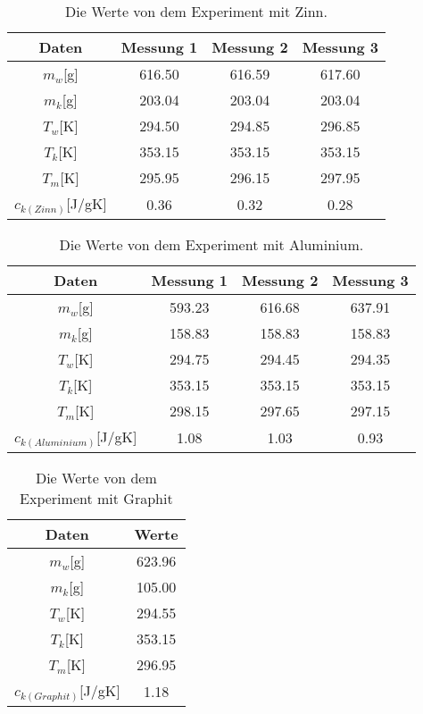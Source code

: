 \begin{table}[htp]
    \centering
    \caption{Die Werte von dem Experiment mit Zinn.}
    \label{tab:tabZn}
    \begin{tabular}{c c c c}
      \toprule
      Daten & Messung 1 & Messung 2 & Messung 3\\
      \midrule
            \(m_w\)[g] & 616.50 & 616.59 & 617.60\\
            \(m_k\)[g] & 203.04 & 203.04 & 203.04\\
            \(T_w\)[K] & 294.50 & 294.85 & 296.85\\
            \(T_k\)[K] & 353.15 & 353.15 & 353.15\\
            \(T_m\)[K] & 295.95 & 296.15 & 297.95\\
      \bottomrule
            \(c_{k(Zinn)}\)[J/gK] & 0.36 & 0.32 & 0.28\\
    \end{tabular}
  \end{table}

  \begin{table}[htp]
    \centering
    \caption{Die Werte von dem Experiment mit Aluminium.}
    \label{tab:tabAl}
    \begin{tabular}{c c c c}
      \toprule
      Daten & Messung 1 & Messung 2 & Messung 3\\
      \midrule
            \(m_w\)[g] & 593.23 & 616.68 & 637.91\\
            \(m_k\)[g] & 158.83 & 158.83 & 158.83\\
            \(T_w\)[K] & 294.75 & 294.45 & 294.35\\
            \(T_k\)[K] & 353.15 & 353.15 & 353.15\\
            \(T_m\)[K] & 298.15 & 297.65 & 297.15\\
      \bottomrule
            \(c_{k(Aluminium)}\)[J/gK] & 1.08 & 1.03 & 0.93\\
    \end{tabular}
  \end{table}

  \begin{table}[htp]
    \centering
    \caption{Die Werte von dem Experiment mit Graphit}
    \label{tab:tabC}
    \begin{tabular}{c c}
      \toprule
      Daten & Werte\\
      \midrule
            \(m_w\)[g] & 623.96\\
            \(m_k\)[g] & 105.00\\
            \(T_w\)[K] & 294.55\\
            \(T_k\)[K] & 353.15\\
            \(T_m\)[K] & 296.95\\
      \bottomrule
            \(c_{k(Graphit)}\)[J/gK] & 1.18\\
    \end{tabular}
  \end{table}


